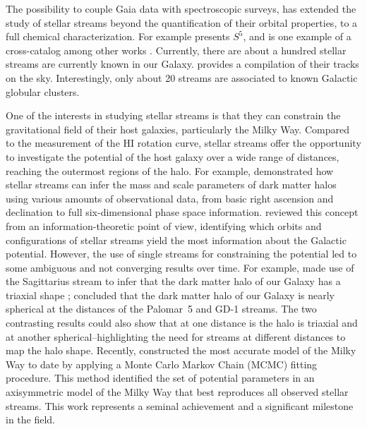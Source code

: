 \documentclass[draft]{aa}
\begin{document}
  The possibility to couple Gaia data with spectroscopic surveys, has extended the study of stellar streams beyond the quantification of their orbital properties, to a full chemical characterization. For example \citet{2019MNRAS.490.3508L} presents $S^5$, and is one example of a cross-catalog among other works \citep{2020AJ....160..181J, 2021ApJ...911..149L, 2022ApJ...928...30L, 2024MNRAS.529.2413U}. Currently, there are about a hundred stellar streams are currently known in our Galaxy. \citet{2023MNRAS.520.5225M} provides a compilation of their tracks on the sky. Interestingly, only about 20 streams are associated to known Galactic globular clusters.

  One of the interests in studying stellar streams is that they can constrain the gravitational field of their host galaxies, particularly the Milky Way. Compared to the measurement of the HI rotation curve, stellar streams offer the opportunity to investigate the potential of the host galaxy over a wide range of distances, reaching the outermost regions of the halo. For example, \citet{2011MNRAS.417..198V} demonstrated how stellar streams can infer the mass and scale parameters of dark matter halos using various amounts of observational data, from basic right ascension and declination to full six-dimensional phase space information. \citet{2018ApJ...867..101B} reviewed this concept from an information-theoretic point of view, identifying which orbits and configurations of stellar streams yield the most information about the Galactic potential. However, the use of single streams for constraining the potential led to some ambiguous and not converging results over time. For example, \citet{2010ApJ...718.1128L} made use of the Sagittarius stream to infer that the dark matter halo of our Galaxy has a triaxial shape \citep[but see also][]{2004MNRAS.351..643H, 2005ApJ...619..800J, 2005ApJ...619..807L}; \citet{2016ApJ...833...31B} concluded that the dark matter halo of our Galaxy is nearly spherical at the distances of the Palomar~5 and GD-1 streams. The two contrasting results could also show that at one distance is the halo is triaxial and at another spherical--highlighting the need for streams at different distances to map the halo shape. Recently, \citet{2024ApJ...967...89I} constructed the most accurate model of the Milky Way to date by applying a Monte Carlo Markov Chain (MCMC) fitting procedure. This method identified the set of potential parameters in an axisymmetric model of the Milky Way that best reproduces all observed stellar streams. This work represents a seminal achievement and a significant milestone in the field.
\end{document}
